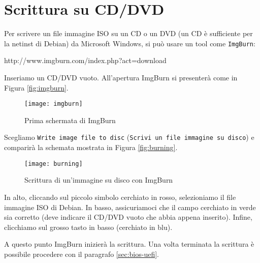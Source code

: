 \section{Scrittura su CD/DVD}
Per scrivere un file immagine ISO su un CD o un DVD (un CD è sufficiente per la netinst di Debian) da Microsoft Windows, si può usare un tool come \texttt{ImgBurn}:

\begin{graybox}
	http://www.imgburn.com/index.php?act=download
\end{graybox}

Inseriamo un CD/DVD vuoto. All'apertura ImgBurn si presenterà come in Figura \vref{fig:imgburn}.

\begin{figure}[ht]
	\centering
	\texttt{[image: imgburn]}
	\caption{Prima schermata di ImgBurn}
	\label{fig:imgburn}
\end{figure}

Scegliamo \texttt{Write image file to disc} (\texttt{Scrivi un file imma\-gine su disco}) e comparirà la schemata mostrata in Figura \vref{fig:burning}.

\begin{figure}[ht]
	\centering
	\texttt{[image: burning]}
	\caption{Scrittura di un'immagine su disco con ImgBurn}
	\label{fig:burning}
\end{figure}

In alto, cliccando sul piccolo simbolo cerchiato in rosso, selezioniamo il file immagine ISO di Debian. In basso, assicuriamoci che il campo cerchiato in verde sia corretto (deve indicare il CD/DVD vuoto che abbia appena inserito). Infine, clicchiamo sul grosso tasto in basso (cerchiato in blu).

A questo punto ImgBurn inizierà la scrittura. Una volta terminata la scrittura è possibile procedere con il paragrafo \vref{sec:bios-uefi}.
